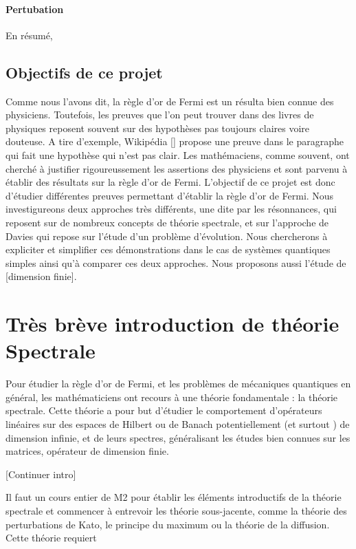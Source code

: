 \documentclass[12pt,openany,a4paper, titlepage]{article}
\theoremstyle{definition}
\theoremstyle{definition}
\theoremstyle{definition}
\theoremstyle{definition}
\theoremstyle{definition}
\theoremstyle{definition}
\begin{document}
\paragraph{Pertubation}


En résumé, 

\subsection{Objectifs de ce projet}

Comme nous l'avons dit, la règle d'or de Fermi est un résulta bien connue des physiciens. Toutefois, les preuves que l'on peut trouver dans des livres de physiques reposent souvent sur des hypothèses pas toujours claires voire douteuse. A tire d'exemple, Wikipédia [] propose une preuve dans le paragraphe qui fait une hypothèse qui n'est pas clair. Les mathémaciens, comme souvent, ont cherché à justifier rigoureussement les assertions des physiciens et sont parvenu à établir des résultats sur la règle d'or de Fermi. L'objectif de ce projet est donc d'étudier différentes preuves permettant d'établir la règle d'or de Fermi. Nous investigureons deux approches très différents, une dite par les résonnances, qui reposent sur de nombreux concepts de théorie spectrale, et sur l'approche de Davies qui repose sur l'étude d'un problème d'évolution. Nous chercherons à expliciter et simplifier ces démonstrations  dans le cas de systèmes quantiques simples ainsi qu'à comparer ces deux approches. Nous proposons aussi l'étude de [dimension finie]. 

\newpage
\section{Très brève introduction de théorie Spectrale}

Pour étudier la règle d'or de Fermi, et les problèmes de mécaniques quantiques en général, les mathématiciens ont recours à une théorie fondamentale : la théorie spectrale. Cette théorie a pour but d'étudier le comportement d'opérateurs linéaires sur des espaces de Hilbert ou de Banach potentiellement (et surtout ) de dimension infinie, et de leurs spectres, généralisant les études bien connues sur les matrices, opérateur de dimension finie. 

[Continuer intro]

Il faut un cours entier de M2 pour établir les éléments introductifs de la théorie spectrale et commencer à entrevoir les théorie sous-jacente, comme la théorie des perturbations de Kato, le principe du maximum ou la théorie de la diffusion. Cette théorie requiert 
\end{document}
